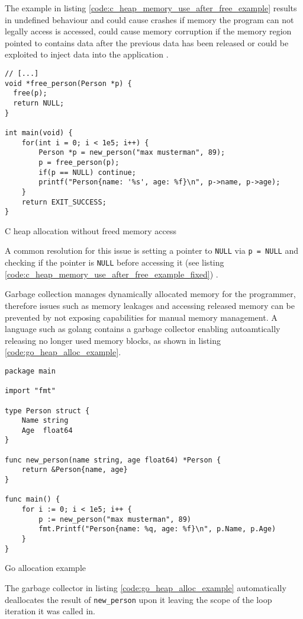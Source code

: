 The example in listing \autoref{code:c_heap_memory_use_after_free_example}
results in undefined behaviour
\cite[Description]{owasp-use-after-free_unkown_unknown} and could cause
crashes if memory the program can not legally access is accessed, could cause
memory corruption if the memory region pointed to contains data after the
previous data has been released or could be exploited to inject data into the
application \cite[Consequences]{owasp-use-after-free_unkown_unknown}.

\begin{listing}[H] 
    \begin{verbatim} 
// [...]
void *free_person(Person *p) {
  free(p);
  return NULL;
}

int main(void) {
    for(int i = 0; i < 1e5; i++) {
        Person *p = new_person("max musterman", 89);
        p = free_person(p);
        if(p == NULL) continue;
        printf("Person{name: '%s', age: %f}\n", p->name, p->age);
    }
    return EXIT_SUCCESS;
}
    \end{verbatim}
    \caption{C heap allocation without freed memory access}
    \label{code:c_heap_memory_use_after_free_example_fixed}
\end{listing}

A common resolution for this issue is setting a pointer to \texttt{NULL} via
\texttt{p = NULL} and checking if the pointer is \texttt{NULL} before
accessing it (see listing
\autoref{code:c_heap_memory_use_after_free_example_fixed}) \cite[Related
Controls]{owasp-use-after-free_unkown_unknown}. 

Garbage collection manages dynamically allocated memory for the programmer,
therefore issues such as memory leakages and accessing released memory can be
prevented by not exposing capabilities for manual memory management. A
language such as golang contains a garbage collector
\cite[Introduction]{go_spec_2023} enabling autoamtically releasing no longer
used memory blocks, as shown in listing \autoref{code:go_heap_alloc_example}.

\begin{listing}[H] 
    \begin{verbatim} 
package main

import "fmt"

type Person struct {
    Name string
    Age  float64
}

func new_person(name string, age float64) *Person {
    return &Person{name, age}
}

func main() {
    for i := 0; i < 1e5; i++ {
        p := new_person("max musterman", 89)
        fmt.Printf("Person{name: %q, age: %f}\n", p.Name, p.Age)
    }
}
    \end{verbatim}
    \caption{Go allocation example}
    \label{code:go_heap_alloc_example}
\end{listing}

The garbage collector in listing \autoref{code:go_heap_alloc_example}
automatically deallocates the result of \texttt{new\_person} upon it leaving
the scope of the loop iteration it was called in.
